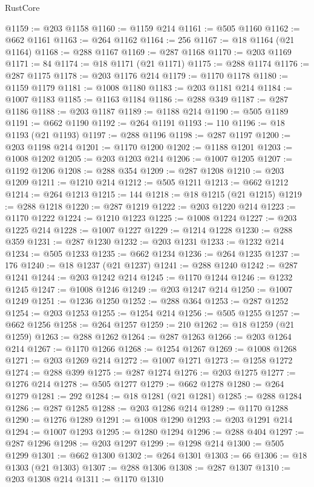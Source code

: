 \begin{lexlean}{RustCore}
\begin{coremodule}
@1159 := @203 @1158
@1160 := @1159 @214
@1161 := @505 @1160
@1162 := @662 @1161
@1163 := @264 @1162
@1164 := 256
@1167 := @18 @1164 (@21 @1164)
@1168 := @288 @1167
@1169 := @287 @1168
@1170 := @203 @1169
@1171 := 84
@1174 := @18 @1171 (@21 @1171)
@1175 := @288 @1174
@1176 := @287 @1175
@1178 := @203 @1176 @214
@1179 := @1170 @1178
@1180 := @1159 @1179
@1181 := @1008 @1180
@1183 := @203 @1181 @214
@1184 := @1007 @1183
@1185 := @1163 @1184
@1186 := @288 @349
@1187 := @287 @1186
@1188 := @203 @1187
@1189 := @1188 @214
@1190 := @505 @1189
@1191 := @662 @1190
@1192 := @264 @1191
@1193 := 110
@1196 := @18 @1193 (@21 @1193)
@1197 := @288 @1196
@1198 := @287 @1197
@1200 := @203 @1198 @214
@1201 := @1170 @1200
@1202 := @1188 @1201
@1203 := @1008 @1202
@1205 := @203 @1203 @214
@1206 := @1007 @1205
@1207 := @1192 @1206
@1208 := @288 @354
@1209 := @287 @1208
@1210 := @203 @1209
@1211 := @1210 @214
@1212 := @505 @1211
@1213 := @662 @1212
@1214 := @264 @1213
@1215 := 144
@1218 := @18 @1215 (@21 @1215)
@1219 := @288 @1218
@1220 := @287 @1219
@1222 := @203 @1220 @214
@1223 := @1170 @1222
@1224 := @1210 @1223
@1225 := @1008 @1224
@1227 := @203 @1225 @214
@1228 := @1007 @1227
@1229 := @1214 @1228
@1230 := @288 @359
@1231 := @287 @1230
@1232 := @203 @1231
@1233 := @1232 @214
@1234 := @505 @1233
@1235 := @662 @1234
@1236 := @264 @1235
@1237 := 176
@1240 := @18 @1237 (@21 @1237)
@1241 := @288 @1240
@1242 := @287 @1241
@1244 := @203 @1242 @214
@1245 := @1170 @1244
@1246 := @1232 @1245
@1247 := @1008 @1246
@1249 := @203 @1247 @214
@1250 := @1007 @1249
@1251 := @1236 @1250
@1252 := @288 @364
@1253 := @287 @1252
@1254 := @203 @1253
@1255 := @1254 @214
@1256 := @505 @1255
@1257 := @662 @1256
@1258 := @264 @1257
@1259 := 210
@1262 := @18 @1259 (@21 @1259)
@1263 := @288 @1262
@1264 := @287 @1263
@1266 := @203 @1264 @214
@1267 := @1170 @1266
@1268 := @1254 @1267
@1269 := @1008 @1268
@1271 := @203 @1269 @214
@1272 := @1007 @1271
@1273 := @1258 @1272
@1274 := @288 @399
@1275 := @287 @1274
@1276 := @203 @1275
@1277 := @1276 @214
@1278 := @505 @1277
@1279 := @662 @1278
@1280 := @264 @1279
@1281 := 292
@1284 := @18 @1281 (@21 @1281)
@1285 := @288 @1284
@1286 := @287 @1285
@1288 := @203 @1286 @214
@1289 := @1170 @1288
@1290 := @1276 @1289
@1291 := @1008 @1290
@1293 := @203 @1291 @214
@1294 := @1007 @1293
@1295 := @1280 @1294
@1296 := @288 @404
@1297 := @287 @1296
@1298 := @203 @1297
@1299 := @1298 @214
@1300 := @505 @1299
@1301 := @662 @1300
@1302 := @264 @1301
@1303 := 66
@1306 := @18 @1303 (@21 @1303)
@1307 := @288 @1306
@1308 := @287 @1307
@1310 := @203 @1308 @214
@1311 := @1170 @1310

\end{coremodule}
\end{lexlean}
